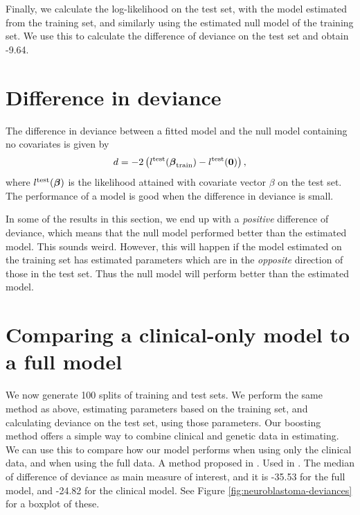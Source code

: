 Finally, we calculate the log-likelihood on the test set, with the model estimated from the training set, and similarly using the estimated null model of the training set.
We use this to calculate the difference of deviance on the test set and obtain -9.64.

\section{Difference in deviance}
The difference in deviance between a fitted model and the null model containing no covariates is given by
\begin{equation*}
    d=-2\left(l^{\text{test}}(\boldsymbol{\beta}_{\text{train}})-l^{\text{test}}(\mathbf{0})\right),
\end{equation*}
where $l^{\text{test}}(\boldsymbol{\beta})$ is the likelihood attained with covariate vector $\beta$ on the test set.
The performance of a model is good when the difference in deviance is small.

In some of the results in this section, we end up with a \textit{positive} difference of deviance, which means that the null model performed better than the estimated model.
This sounds weird.
However, this will happen if the model estimated on the training set has estimated parameters which are in the \textit{opposite} direction of those in the test set.
Thus the null model will perform better than the estimated model.

\section{Comparing a clinical-only model to a full model}
We now generate 100 splits of training and test sets.
We perform the same method as above, estimating parameters based on the training set, and calculating deviance on the test set, using those parameters.
Our boosting method offers a simple way to combine clinical and genetic data in estimating.
We can use this to compare how our model performs when using only the clinical data, and when using the full data.
A method proposed in \citet{bovelstad2007}. Used in \citep{bovelstad2009}.
The median of difference of deviance as main measure of interest, and it is -35.53 for the full model, and -24.82 for the clinical model.
See Figure \ref{fig:neuroblastoma-deviances} for a boxplot of these.


